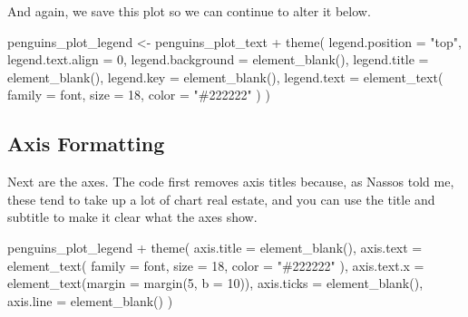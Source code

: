 \documentclass[
]{book}
\newenvironment{Shaded}{\begin{snugshade}}{\end{snugshade}}
\newcommand{\AttributeTok}[1]{\textcolor[rgb]{0.77,0.63,0.00}{#1}}
\newcommand{\DecValTok}[1]{\textcolor[rgb]{0.00,0.00,0.81}{#1}}
\newcommand{\FunctionTok}[1]{\textcolor[rgb]{0.00,0.00,0.00}{#1}}
\newcommand{\NormalTok}[1]{#1}
\newcommand{\OtherTok}[1]{\textcolor[rgb]{0.56,0.35,0.01}{#1}}
\newcommand{\SpecialCharTok}[1]{\textcolor[rgb]{0.00,0.00,0.00}{#1}}
\newcommand{\StringTok}[1]{\textcolor[rgb]{0.31,0.60,0.02}{#1}}
\begin{document}
And again, we save this plot so we can continue to alter it below.

\begin{Shaded}
\begin{Highlighting}[]
\NormalTok{penguins\_plot\_legend }\OtherTok{\textless{}{-}}\NormalTok{ penguins\_plot\_text }\SpecialCharTok{+}
  \FunctionTok{theme}\NormalTok{(}
    \AttributeTok{legend.position =} \StringTok{"top"}\NormalTok{,}
    \AttributeTok{legend.text.align =} \DecValTok{0}\NormalTok{,}
    \AttributeTok{legend.background =} \FunctionTok{element\_blank}\NormalTok{(),}
    \AttributeTok{legend.title =} \FunctionTok{element\_blank}\NormalTok{(),}
    \AttributeTok{legend.key =} \FunctionTok{element\_blank}\NormalTok{(),}
    \AttributeTok{legend.text =} \FunctionTok{element\_text}\NormalTok{(}
      \AttributeTok{family =}\NormalTok{ font,}
      \AttributeTok{size =} \DecValTok{18}\NormalTok{,}
      \AttributeTok{color =} \StringTok{"\#222222"}
\NormalTok{    )}
\NormalTok{  )}
\end{Highlighting}
\end{Shaded}

\hypertarget{axis-formatting}{%
\subsection*{Axis Formatting}\label{axis-formatting}}

Next are the axes. The code first removes axis titles because, as Nassos told me, these tend to take up a lot of chart real estate, and you can use the title and subtitle to make it clear what the axes show.

\begin{Shaded}
\begin{Highlighting}[]
\NormalTok{penguins\_plot\_legend }\SpecialCharTok{+}
  \FunctionTok{theme}\NormalTok{(}
    \AttributeTok{axis.title =} \FunctionTok{element\_blank}\NormalTok{(),}
    \AttributeTok{axis.text =} \FunctionTok{element\_text}\NormalTok{(}
      \AttributeTok{family =}\NormalTok{ font,}
      \AttributeTok{size =} \DecValTok{18}\NormalTok{,}
      \AttributeTok{color =} \StringTok{"\#222222"}
\NormalTok{    ),}
    \AttributeTok{axis.text.x =} \FunctionTok{element\_text}\NormalTok{(}\AttributeTok{margin =} \FunctionTok{margin}\NormalTok{(}\DecValTok{5}\NormalTok{, }\AttributeTok{b =} \DecValTok{10}\NormalTok{)),}
    \AttributeTok{axis.ticks =} \FunctionTok{element\_blank}\NormalTok{(),}
    \AttributeTok{axis.line =} \FunctionTok{element\_blank}\NormalTok{()}
\NormalTok{  )}
\end{Highlighting}
\end{Shaded}
\end{document}
